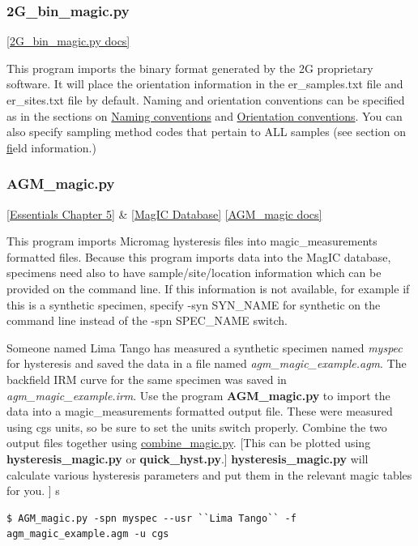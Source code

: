\documentclass[11pt]{book}
\begin{document}
{{\subsubsection{2G\_bin\_magic.py}
\href{https://github.com/PmagPy/PmagPy/blob/master/programs/2G_bin_magic.py}{[2G\_bin\_magic.py docs]}

This program imports the binary format generated by the 2G proprietary software.   It will place the orientation information in the er\_samples.txt file and er\_sites.txt file by default.  Naming and orientation conventions can be specified as in the sections on \href{#naming_schemes}{Naming conventions} and \href{#orientation_schemes}{Orientation conventions}.  You can also specify sampling method codes that pertain to ALL samples (see section on \href{#field_info} field information.)



\subsubsection {AGM\_magic.py} \href{http://earthref.org/MAGIC/books/Tauxe/Essentials/WebBook3ch5.html#ch5}{[Essentials Chapter 5]} \& \href{#MagICDatabase}{[MagIC Database]}
\href{https://github.com/PmagPy/PmagPy/blob/master/programs/AGM_magic.py}{[AGM\_magic docs]}


This program imports Micromag  hysteresis files into magic\_measurements formatted files.
Because this program imports data into the MagIC database, specimens need also to have sample/site/location information which can be provided on the command line. If this information is not available, for example if this is a synthetic specimen,  specify -syn  SYN\_NAME for synthetic on the command line instead of the -spn SPEC\_NAME switch.

Someone named Lima Tango has measured a  synthetic specimen named {\it myspec}  for hysteresis and saved the data in a file named {\it agm\_magic\_example.agm}.   The backfield IRM curve for the same specimen was saved in {\it agm\_magic\_example.irm}.  Use the program {\bf AGM\_magic.py} to import the data into a magic\_measurements formatted output file.  These were measured using cgs units, so be sure to set the units switch properly.   Combine the two output files together using \href{#combine_magic.py}{combine\_magic.py}.    [This can be plotted using {\bf hysteresis\_magic.py} or {\bf quick\_hyst.py}.]    {\bf hysteresis\_magic.py} will calculate various hysteresis parameters and put them in the relevant magic tables for you.  ]
s
\begin{verbatim}
$ AGM_magic.py -spn myspec --usr ``Lima Tango`` -f agm_magic_example.agm -u cgs


\end{verbatim}}}
\end{document}
